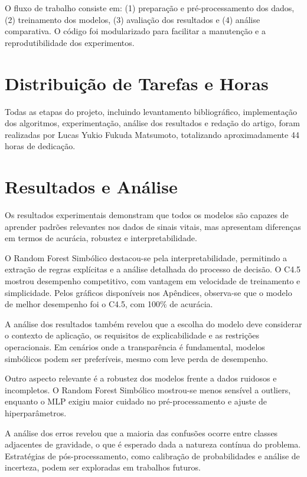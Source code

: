 \documentclass[11pt]{article}
\begin{document}
O fluxo de trabalho consiste em: (1) preparação e pré-processamento dos dados, (2) treinamento dos modelos, (3) avaliação dos resultados e (4) análise comparativa. O código foi modularizado para facilitar a manutenção e a reprodutibilidade dos experimentos.

\section{Distribuição de Tarefas e Horas}
Todas as etapas do projeto, incluindo levantamento bibliográfico, implementação dos algoritmos, experimentação, análise dos resultados e redação do artigo, foram realizadas por Lucas Yukio Fukuda Matsumoto, totalizando aproximadamente 44 horas de dedicação.

\section{Resultados e Análise}
Os resultados experimentais demonstram que todos os modelos são capazes de aprender padrões relevantes nos dados de sinais vitais, mas apresentam diferenças em termos de acurácia, robustez e interpretabilidade.

O Random Forest Simbólico destacou-se pela interpretabilidade, permitindo a extração de regras explícitas e a análise detalhada do processo de decisão. O C4.5 mostrou desempenho competitivo, com vantagem em velocidade de treinamento e simplicidade. Pelos gráficos disponíveis nos Apêndices, observa-se que o modelo de melhor desempenho foi o C4.5, com 100\% de acurácia.

A análise dos resultados também revelou que a escolha do modelo deve considerar o contexto de aplicação, os requisitos de explicabilidade e as restrições operacionais. Em cenários onde a transparência é fundamental, modelos simbólicos podem ser preferíveis, mesmo com leve perda de desempenho.

Outro aspecto relevante é a robustez dos modelos frente a dados ruidosos e incompletos. O Random Forest Simbólico mostrou-se menos sensível a outliers, enquanto o MLP exigiu maior cuidado no pré-processamento e ajuste de hiperparâmetros.

A análise dos erros revelou que a maioria das confusões ocorre entre classes adjacentes de gravidade, o que é esperado dada a natureza contínua do problema. Estratégias de pós-processamento, como calibração de probabilidades e análise de incerteza, podem ser exploradas em trabalhos futuros.
\end{document}
